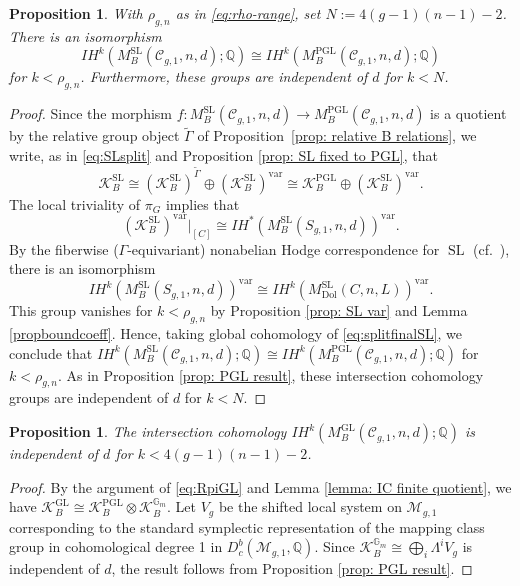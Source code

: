 \documentclass[11pt,reqno]{amsart}
\theoremstyle{plain} %
\newtheorem{prop}[theorem]{Proposition}
\theoremstyle{definition}
\newcommand{\QQ}{\mathbb{Q}}
\newcommand{\M}{\mathcal{M}}
\newcommand{\C}{\mathcal{C}}
\DeclareMathOperator{\GL}{GL}
\DeclareMathOperator{\SL}{SL}
\DeclareMathOperator{\PGL}{PGL}
\newcommand{\Dol}{\mathrm{Dol}}
\newcommand{\IH}{I\!H}
\begin{document}
\begin{prop} \label{prop: SL result}
With $\rho_{g,n}$ as in \eqref{eq:rho-range}, set $N:=4(g-1)(n-1)-2$. There is an isomorphism
$$\IH^k(M^{\SL}_B(\C_{g,1},n,d); \QQ) \cong \IH^k(M^{\PGL}_B(\C_{g,1},n,d); \QQ) $$
    for $k < \rho_{g,n}$. Furthermore, these groups are independent of $d$ for $k < N$. %
\end{prop}

\begin{proof}
Since the morphism $f\colon M^{\SL}_B(\C_{g,1},n,d) \to M_B^{\PGL}(\C_{g,1},n,d)$ is a quotient by the relative group object $\widetilde\Gamma$ of Proposition~\ref{prop: relative B relations}, we write, as in \eqref{eq:SLsplit} and Proposition \ref{prop: SL fixed to PGL}, that
\begin{equation}\label{eq:splitfinalSL}
    \mathcal{K}^{\SL}_{B} \cong (\mathcal{K}^{\SL}_{B})^{\widetilde\Gamma} \oplus (\mathcal{K}^{\SL}_{B})^{\mathrm{var}} \cong \mathcal{K}^{\PGL}_{B} \oplus (\mathcal{K}^{\SL}_{B})^{\mathrm{var}}.
\end{equation}
The local triviality of  $\pi_G$ implies that \[(\mathcal{K}^{\SL}_{B})^{\mathrm{var}}|_{[C]} \cong \IH^*(M^{\SL}_{B}(S_{g,1}, n, d))^{\mathrm{var}}.\]
By the fiberwise ($\Gamma$-equivariant) nonabelian Hodge correspondence for $\SL$ \cite[Theorem 4.3]{Hausel-handbook} (cf.~\cite[Remark 5 after Theorem 1]{H2024}), there is an isomorphism
\[
\IH^k(M^{\SL}_{B}(S_{g,1}, n, d))^{\mathrm{var}} \cong \IH^k(M^{\SL}_{\Dol}(C, n, L))^{\mathrm{var}}.
\]
This group vanishes for $k< \rho_{g,n}$ by Proposition \ref{prop: SL var} and Lemma \ref{propboundcoeff}. Hence, taking global cohomology of \eqref{eq:splitfinalSL}, we conclude that $\IH^k(M^{\SL}_B(\C_{g,1},n,d); \QQ) \cong \IH^k(M^{\PGL}_B(\C_{g,1},n,d); \QQ)$
    for $k < \rho_{g,n}$. As in Proposition \ref{prop: PGL result}, these intersection cohomology groups are independent of $d$ for $k < N$.
\end{proof}

\begin{prop}\label{main resultGL} The intersection cohomology  $\IH^k(M^{\GL}_B(\C_{g,1},n,d); \QQ)$ is independent of $d$ for
    $k < 4(g-1)(n-1)-2$.
\end{prop}

\begin{proof}
By the argument of \eqref{eq:RpiGL} and Lemma \ref{lemma: IC finite quotient}, we have 
$\mathcal{K}^{\GL}_{B} \cong \mathcal{K}^{\PGL}_{B} \otimes \mathcal{K}^{\mathbb{G}_m}_{B}$.
Let $V_{g}$ be the shifted local system on $\mathcal{M}_{g,1}$ corresponding to the standard symplectic representation of the mapping class group in cohomological degree 1 in $D^b_c(\M_{g,1}, \QQ)$. Since  $\mathcal{K}^{\mathbb{G}_m}_{B} \cong \bigoplus_i \Lambda^i V_g$ is independent of $d$, the result follows from Proposition \ref{prop: PGL result}.
\end{proof}
\end{document}
